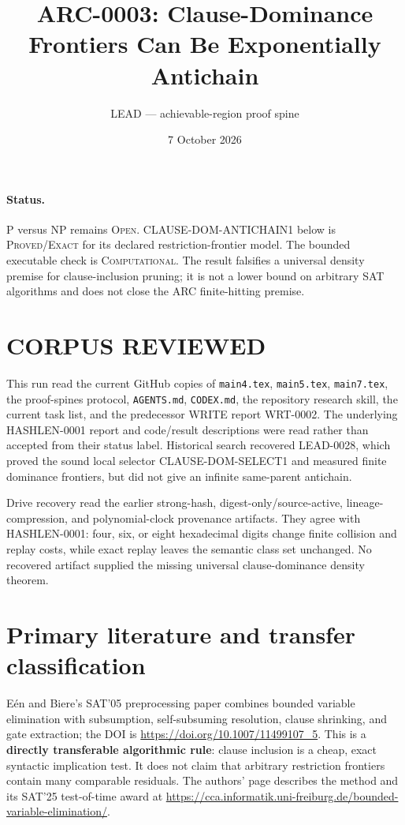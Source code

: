 \documentclass[11pt]{article}
\title{ARC-0003: Clause-Dominance Frontiers Can Be Exponentially Antichain}
\author{LEAD --- achievable-region proof spine}
\date{7 October 2026}
\begin{document}
\maketitle

\paragraph{Status.}
P versus NP remains \textsc{Open}.  CLAUSE-DOM-ANTICHAIN1 below is
\textsc{Proved/Exact} for its declared restriction-frontier model.  The
bounded executable check is \textsc{Computational}.  The result falsifies a
universal density premise for clause-inclusion pruning; it is not a lower
bound on arbitrary SAT algorithms and does not close the ARC finite-hitting
premise.

\section{CORPUS REVIEWED}
This run read the current GitHub copies of \texttt{main4.tex},
\texttt{main5.tex}, \texttt{main7.tex}, the proof-spines protocol,
\texttt{AGENTS.md}, \texttt{CODEX.md}, the repository research skill, the
current task list, and the predecessor WRITE report WRT-0002.  The underlying
HASHLEN-0001 report and code/result descriptions were read rather than
accepted from their status label.  Historical search recovered LEAD-0028,
which proved the sound local selector CLAUSE-DOM-SELECT1 and measured finite
dominance frontiers, but did not give an infinite same-parent antichain.

Drive recovery read the earlier strong-hash, digest-only/source-active,
lineage-compression, and polynomial-clock provenance artifacts.  They agree
with HASHLEN-0001: four, six, or eight hexadecimal digits change finite
collision and replay costs, while exact replay leaves the semantic class set
unchanged.  No recovered artifact supplied the missing universal
clause-dominance density theorem.

\section{Primary literature and transfer classification}
E\'en and Biere's SAT'05 preprocessing paper combines bounded variable
elimination with subsumption, self-subsuming resolution, clause shrinking,
and gate extraction; the DOI is
\url{https://doi.org/10.1007/11499107_5}.  This is a
\textbf{directly transferable algorithmic rule}: clause inclusion is a cheap,
exact syntactic implication test.  It does not claim that arbitrary
restriction frontiers contain many comparable residuals.  The authors' page
describes the method and its SAT'25 test-of-time award at
\url{https://cca.informatik.uni-freiburg.de/bounded-variable-elimination/}.
\end{document}
